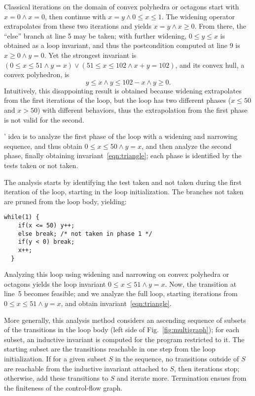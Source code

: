 \documentclass[preprint]{sigplanconf}
\begin{document}
Classical iterations on the domain of convex polyhedra \cite{Halbwachs_PhD,CousotHalbwachs78} or octagons \cite{Mine_PhD,DBLP:journals/lisp/Mine06} start with $x = 0 \land x = 0$, then continue with $x = y \land 0 \leq x \leq 1$.
The widening operator extrapolates from these two iterations and yields $x = y \land x \geq 0$.
From there, the ``else'' branch at line 5 may be taken; with further widening, $0 \leq y \leq x$ is obtained as a loop invariant, and thus the postcondition computed at line 9 is $x \geq 0 \land y = 0$.
Yet the strongest invariant is $(0 \leq x \leq 51 \land y = x) \lor (51 \leq x \leq 102 \land x+y=102)$, and its convex hull, a convex polyhedron, is
\begin{equation}
y \leq x \land y \leq 102-x \land y \geq 0.\label{eqn:triangle}
\end{equation} %
Intuitively, this disappointing result is obtained because widening extrapolates from the first iterations of the loop, but the loop has two different phases ($x \leq 50$ and $x > 50$) with different behaviors, thus the extrapolation from the first phase is not valid for the second.

\citeauthor{DBLP:conf/sas/GopanR07}' idea is to analyze the first phase of the loop with a widening and narrowing sequence, and thus obtain $0 \leq x \leq 50 \land y = x$, and then analyze the second phase, finally obtaining invariant~\ref{eqn:triangle}; each phase is identified by the tests taken or not taken.

The analysis starts by identifying the test taken and not taken during the first iteration of the loop, starting in the loop initialization. The branches not taken are pruned from the loop body, yielding:
\begin{lstlisting}[numbers=none]
  while(1) {
    if(x <= 50) y++;
    else break; /* not taken in phase 1 */
    if(y < 0) break;
    x++;
  }
\end{lstlisting}

Analyzing this loop using widening and narrowing on convex polyhedra or octagons yields the loop invariant $0 \leq x \leq 51 \land y = x$. Now, the transition at line~5 becomes feasible; and we analyze the full loop, starting iterations from $0 \leq x \leq 51 \land y = x$, and obtain invariant~\ref{eqn:triangle}.

More generally, this analysis method considers an ascending sequence of subsets of the transitions in the loop body (left side of Fig.~\ref{fig:multigraph});
for each subset, an inductive invariant is computed for the program restricted to it.
The starting subset are the transitions reachable in one step from the loop initialization.
If for a given subset $S$ in the sequence, no transitions outside of $S$ are reachable from the inductive invariant attached to $S$, then iterations stop;
otherwise, add these transitions to $S$ and iterate more.
Termination ensues from the finiteness of the control-flow graph.
\end{document}

